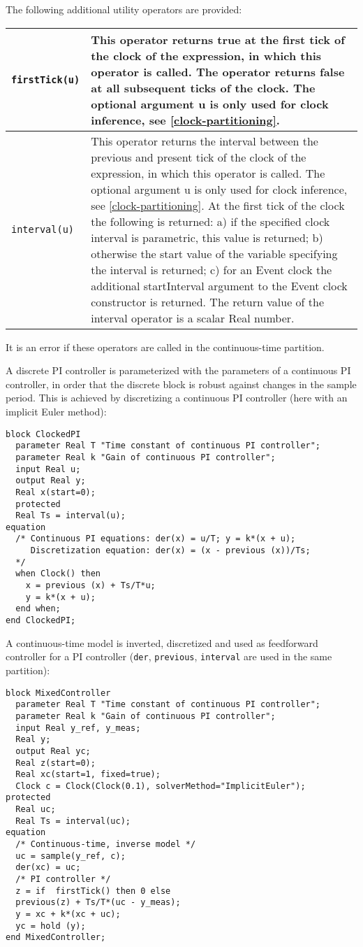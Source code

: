 The following additional utility operators are provided:
\begin{longtable}[]{|l|p{12cm}|}
\hline \endhead
\lstinline!firstTick(u)! &
This operator returns true at the first tick of the clock of the
expression, in which this operator is called. The operator returns false
at all subsequent ticks of the clock. The optional argument u is only
used for clock inference, see \cref{clock-partitioning}.\\ \hline
\lstinline!interval(u)! &
This operator returns the interval between the previous and present tick
of the clock of the expression, in which this operator is called. The
optional argument u is only used for clock inference, see \cref{clock-partitioning}.
At the first tick of the clock the following is returned: a) if the
specified clock interval is parametric, this value is returned; b)
otherwise the start value of the variable specifying the interval is
returned; c) for an Event clock the additional startInterval argument to
the Event clock constructor is returned. The return value of the
interval operator is a scalar Real number.
\\ \hline
\end{longtable}

It is an error if these operators are called in the continuous-time
partition.

\begin{example}
A discrete PI controller is parameterized with the parameters of a continuous PI controller, in order that the discrete block is robust against changes in the sample
period.  This is achieved by discretizing a continuous PI controller (here with an implicit Euler method):
\begin{lstlisting}[language=modelica]
block ClockedPI
  parameter Real T "Time constant of continuous PI controller";
  parameter Real k "Gain of continuous PI controller";
  input Real u;
  output Real y;
  Real x(start=0);
  protected
  Real Ts = interval(u);
equation
  /* Continuous PI equations: der(x) = u/T; y = k*(x + u);
     Discretization equation: der(x) = (x - previous (x))/Ts;
  */
  when Clock() then
    x = previous (x) + Ts/T*u;
    y = k*(x + u);
  end when;
end ClockedPI;
\end{lstlisting}
A continuous-time model is inverted, discretized and used as feedforward controller for a PI controller (\lstinline!der!, \lstinline!previous!, \lstinline!interval! are used in the same partition):
\begin{lstlisting}[language=modelica]
block MixedController
  parameter Real T "Time constant of continuous PI controller";
  parameter Real k "Gain of continuous PI controller";
  input Real y_ref, y_meas;
  Real y;
  output Real yc;
  Real z(start=0);
  Real xc(start=1, fixed=true);
  Clock c = Clock(Clock(0.1), solverMethod="ImplicitEuler");
protected
  Real uc;
  Real Ts = interval(uc);
equation
  /* Continuous-time, inverse model */
  uc = sample(y_ref, c);
  der(xc) = uc;
  /* PI controller */
  z = if  firstTick() then 0 else
  previous(z) + Ts/T*(uc - y_meas);
  y = xc + k*(xc + uc);
  yc = hold (y);
end MixedController;
\end{lstlisting}
\end{example}

